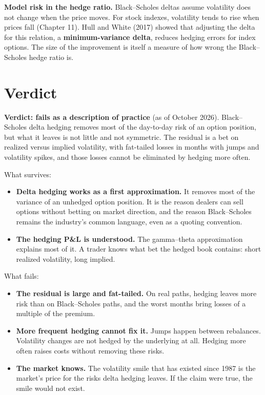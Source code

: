 \textbf{Model risk in the hedge ratio.} Black--Scholes deltas assume volatility does not change when the price moves. For stock indexes, volatility tends to rise when prices fall (Chapter 11). Hull and White (2017) showed that adjusting the delta for this relation, a \textbf{minimum-variance delta}, reduces hedging errors for index options. The size of the improvement is itself a measure of how wrong the Black--Scholes hedge ratio is.

\section{Verdict}
\label{sec:15-verdict}

\begin{callout}
\textbf{Verdict: fails as a description of practice} (as of October 2026). Black--Scholes delta hedging removes most of the day-to-day risk of an option position, but what it leaves is not little and not symmetric. The residual is a bet on realized versus implied volatility, with fat-tailed losses in months with jumps and volatility spikes, and those losses cannot be eliminated by hedging more often.
\end{callout}

What survives:

\begin{itemize}
  \item \textbf{Delta hedging works as a first approximation.} It removes most of the variance of an unhedged option position. It is the reason dealers can sell options without betting on market direction, and the reason Black--Scholes remains the industry's common language, even as a quoting convention.
  \item \textbf{The hedging P\&L is understood.} The gamma--theta approximation explains most of it. A trader knows what bet the hedged book contains: short realized volatility, long implied.
\end{itemize}

What fails:

\begin{itemize}
  \item \textbf{The residual is large and fat-tailed.} On real paths, hedging leaves more risk than on Black--Scholes paths, and the worst months bring losses of a multiple of the premium.
  \item \textbf{More frequent hedging cannot fix it.} Jumps happen between rebalances. Volatility changes are not hedged by the underlying at all. Hedging more often raises costs without removing these risks.
  \item \textbf{The market knows.} The volatility smile that has existed since 1987 is the market's price for the risks delta hedging leaves. If the claim were true, the smile would not exist.
\end{itemize}

